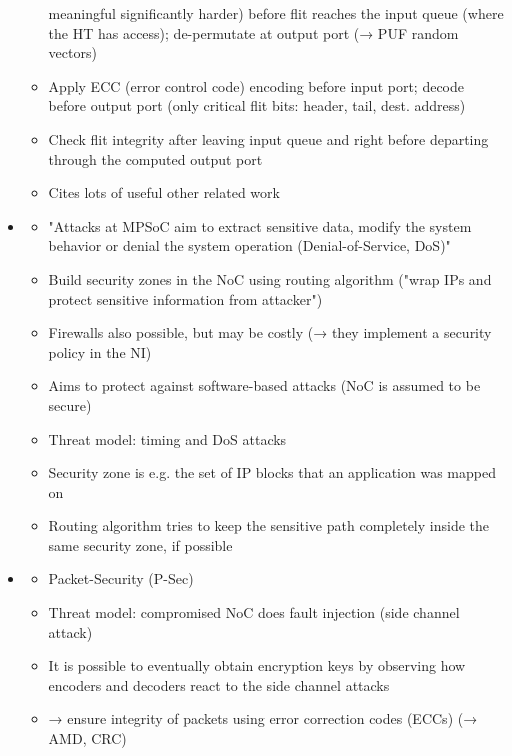 \begin{itemize}
\begin{itemize}
                meaningful significantly harder) before flit reaches the input queue (where the HT has access); de-permutate at output port (→
                PUF random vectors)
            \item Apply ECC (error control code) encoding before input port; decode before output port (only critical flit bits: header, tail,
                dest. address)
            \item Check flit integrity after leaving input queue and right before departing through the computed output port
            \item Cites lots of useful other related work
        \end{itemize}
    \item \textbf{}
        \begin{itemize}
            \item "Attacks at MPSoC aim to extract sensitive data, modify the system behavior or denial the system operation (Denial-of-Service,
                DoS)"
            \item Build security zones in the NoC using routing algorithm ("wrap IPs and protect sensitive information from attacker")
            \item Firewalls also possible, but may be costly (→ they implement a security policy in the NI)
            \item Aims to protect against software-based attacks (NoC is assumed to be secure)
            \item Threat model: timing and DoS attacks
            \item Security zone is e.g. the set of IP blocks that an application was mapped on
            \item Routing algorithm tries to keep the sensitive path completely inside the same security zone, if possible
        \end{itemize}
    \item \textbf{}
        \begin{itemize}
            \item Packet-Security (P-Sec)
            \item Threat model: compromised NoC does fault injection (side channel attack)
            \item It is possible to eventually obtain encryption keys by observing how encoders and decoders react to the side channel attacks
            \item → ensure integrity of packets using error correction codes (ECCs) (→ AMD, CRC)

\end{itemize}
\end{itemize}
